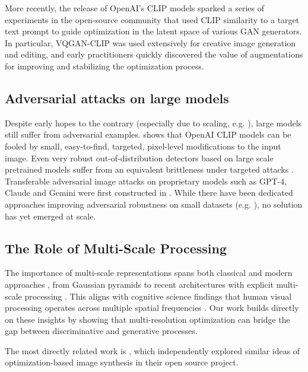 More recently, the release of OpenAI's CLIP models \cite{radford2021learningtransferablevisualmodels} sparked a series of experiments in the open-source community that used CLIP similarity to a target text prompt to guide optimization in the latent space of various GAN generators. In particular, VQGAN-CLIP \cite{crowson2022vqgan} was used extensively for creative image generation and editing, and early practitioners quickly discovered the value of augmentations for improving and stabilizing the optimization process.

\subsection{Adversarial attacks on large models}
Despite early hopes to the contrary (especially due to scaling, e.g. \citet{dehghani2023scalingvisiontransformers22}), large models still suffer from adversarial examples. \citet{Fort2021CLIPadversarial, Fort2021CLIPadversarialstickers} shows that OpenAI CLIP models \citep{radford2021learningtransferablevisualmodels} can be fooled by small, easy-to-find, targeted, pixel-level modifications to the input image. Even very robust out-of-distribution detectors based on large scale pretrained models \citep{fort2021exploringlimitsoutofdistributiondetection} suffer from an equivalent brittleness under targeted attacks \citep{fort2022adversarialvulnerabilitypowerfulnear}. Transferable adversarial image attacks on proprietary models such as GPT-4, Claude and Gemini were first constructed in \citet{fort2024ensembleeverywheremultiscaleaggregation}. While there have been dedicated approaches improving adversarial robustness on small datasets (e.g. \citet{madry2019deeplearningmodelsresistant}), no solution has yet emerged at scale.

\subsection{The Role of Multi-Scale Processing}
The importance of multi-scale representations spans both classical and modern approaches \citep{Lindeberg01011994}, from Gaussian pyramids \cite{1095851} to recent architectures with explicit multi-scale processing \cite{fort2024ensembleeverywheremultiscaleaggregation}. This aligns with cognitive science findings that human visual processing operates across multiple spatial frequencies \cite{JEANTET2018123}. Our work builds directly on these insights by showing that multi-resolution optimization can bridge the gap between discriminative and generative processes.

The most directly related work is \citet{whitaker2024imstack}, which independently explored similar ideas of optimization-based image synthesis in their open source project.